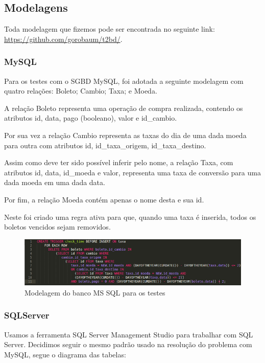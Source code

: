\documentclass[conference]{IEEEtran}
\begin{document}
  \subsection{Modelagens}

    Toda modelagem que fizemos pode ser encontrada no seguinte link: \href{https://github.com/gorobaum/t2bd/}{https://github.com/gorobaum/t2bd/}.

    \subsubsection{MySQL}
    Para os testes com o SGBD MySQL, foi adotada a seguinte modelagem com quatro relações: Boleto; Cambio; Taxa; e Moeda.

    A relação Boleto representa uma operação de compra realizada, contendo os atributos id, data, pago (booleano), valor e id\_cambio.

    Por sua vez a relação Cambio representa as taxas do dia de uma dada moeda para outra com atributos id, id\_taxa\_origem, id\_taxa\_destino.

    Assim como deve ter sido possível inferir pelo nome, a relação Taxa, com atributos id, data, id\_moeda e valor, representa uma taxa de conversão para uma dada moeda em uma dada data.

    Por fim, a relação Moeda contém apenas o nome desta e sua id.

    Neste foi criado uma regra ativa para que, quando uma taxa é inserida, todos os boletos vencidos sejam removidos.

    \begin{figure}[!t]
      \centering
      \includegraphics[scale=0.40]{img/trigger-mysql.png}
      \caption{Modelagem do banco MS SQL para os testes}
    \end{figure}

    \subsubsection{SQLServer}
  	Usamos a ferramenta SQL Server Management Studio para trabalhar com SQL Server.			
  	Decidimos seguir o mesmo padrão usado na resolução do problema com MySQL, segue o diagrama das tabelas:
   
\end{document}

